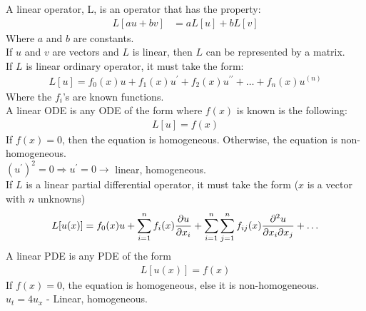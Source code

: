 \documentclass{article}
\begin{document}
\dfn A linear operator, L, is an operator that has the property:
\begin{align}
  L[au + bv] & = aL[u] + bL[v]
\end{align}
Where $a$ and $b$ are constants.\\
\thm If $u$ and $v$ are vectors and $L$ is linear, then $L$ can be represented by a matrix.\\
\thm If $L$ is linear ordinary operator, it must take the form:
\begin{align}
  L[u] = f_0(x)u + f_1(x)u^\prime + f_2(x)u^{\prime\prime} + \ldots + f_n(x)u^{(n)}
\end{align}
Where the $f_i$'s are known functions.\\
\dfn A linear ODE is any ODE of the form where $f(x)$ is known is the following:
\begin{align}
  L[u] = f(x)
\end{align}
If $f(x) = 0$, then the equation is homogeneous. Otherwise, the equation is non-homogeneous.\\
\ex $(u^\prime)^2 = 0 \Rightarrow u^\prime = 0 \rightarrow$ linear, homogeneous.\\
\thm If $L$ is a linear partial differential operator, it must take the form ($x$ is a vector with $n$ unknowns)
\begin{align}
  L[u(x)] = f_0(x)u + \sum^n_{i = 1} f_i(x) \frac{\partial u}{\partial x_i} +
  \sum^n_{i = 1} \sum^n_{j = 1} f_{ij}(x) \frac{\partial^2 u}{\partial x_i \partial x_j} + \ldots
\end{align}
\dfn A linear PDE is any PDE of the form
\begin{align}
  L[u(x)] = f(x)
\end{align}
If $f(x) = 0$, the equation is homogeneous, else it is non-homogeneous.\\
\ex $u_t = 4u_x$ - Linear, homogeneous.
\newpage
\end{document}
